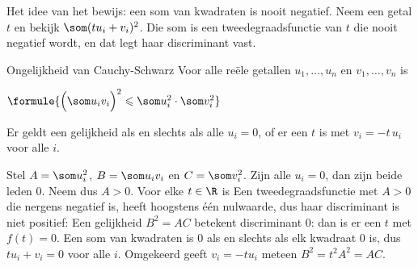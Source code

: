 Het idee van het bewijs: een som van kwadraten is nooit negatief. Neem een getal $t$ en bekijk $\som (t u_i + v_i)^2$. Die som is een tweedegraadsfunctie van $t$ die nooit negatief wordt, en dat legt haar discriminant vast.

\begin{theorie}
\begin{stelling}{Ongelijkheid van Cauchy-Schwarz}
Voor alle reële getallen $u_1, \ldots, u_n$ en $v_1, \ldots, v_n$ is

\qquad $\formule{\Bigl(\som u_i v_i\Bigr)^2 \leqslant \som u_i^2 \cdot \som v_i^2}$

Er geldt een gelijkheid als en slechts als alle $u_i = 0$, of er een $t$ is met $v_i = -t\,u_i$ voor alle $i$.
\end{stelling}

\begin{bewijs}
Stel $A = \som u_i^2$, $B = \som u_i v_i$ en $C = \som v_i^2$. Zijn alle $u_i = 0$, dan zijn beide leden 0. Neem dus $A > 0$. Voor elke $t \in \R$ is
Een tweedegraadsfunctie met $A > 0$ die nergens negatief is, heeft hoogstens één nulwaarde, dus haar discriminant is niet positief:
Een gelijkheid $B^2 = AC$ betekent discriminant 0: dan is er een $t$ met $f(t) = 0$. Een som van kwadraten is 0 als en slechts als elk kwadraat 0 is, dus $t u_i + v_i = 0$ voor alle $i$. Omgekeerd geeft $v_i = -t u_i$ meteen $B^2 = t^2 A^2 = AC$.
\end{bewijs}
\end{theorie}


